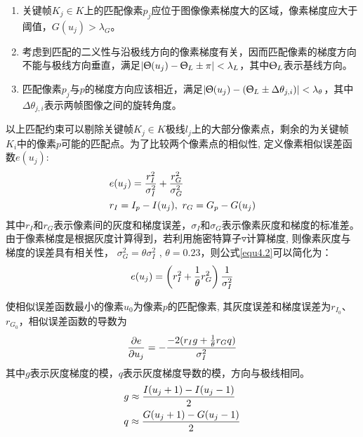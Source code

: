 \begin{enumerate}[label={(\arabic*)}]

\item 关键帧$K_j \in K$上的匹配像素$p_j$应位于图像像素梯度大的区域，像素梯度应大于阈值，$G(u_j)> \lambda_G$。

\item 考虑到匹配的二义性与沿极线方向的像素梯度有关，因而匹配像素的梯度方向不能与极线方向垂直，满足$\vert \Uptheta(u_j)-\Uptheta_L \pm \pi \vert < \lambda_L$，其中$\Uptheta_L$表示基线方向。

\item 匹配像素$p_j$与$p$的梯度方向应该相近，满足$\vert \Uptheta(u_j)-(\Uptheta_L \pm \Delta \theta_{j,i}) \vert < \lambda_\theta $，其中$\Delta \theta_{j,i}$表示两帧图像之间的旋转角度。

\end{enumerate}
以上匹配约束可以剔除关键帧$K_j \in K$极线$l_j$上的大部分像素点，剩余的为关键帧$K_i$中的像素$p$可能的匹配点。为了比较两个像素点的相似性, 定义像素相似误差函数$e(u_j)$:
\begin{equation}
\label{equ4.2}
\begin{aligned}
& e(u_j) = {r_I^2 \over \sigma_I^2} + {r_G^2 \over \sigma_G^2} \\ 
& r_I = I_p-I(u_j),\  r_G = G_p-G(u_j)
\end{aligned}
\end{equation}
其中$r_I$和$r_G$表示像素间的灰度和梯度误差，$\sigma_I$和$\sigma_G$表示像素灰度和梯度的标准差。由于像素梯度是根据灰度计算得到，若利用施密特算子$\triangledown$计算梯度, 则像素灰度与梯度的误差具有相关性，
$\sigma_G^2=\theta \sigma_I^2$ , $ \theta = 0.23$，则公式\eqref{equ4.2}可以简化为：
\begin{equation}
\label{equ4.3}
 e(u_j) = \left( {r_I^2}+{1 \over \theta} r_G^2 \right) {1 \over \sigma_I^2}
\end{equation} 

使相似误差函数最小的像素$u_0$为像素$p$的匹配像素, 其灰度误差和梯度误差为$r_{I_0}$、$r_{G_0}$，相似误差函数的导数为
\begin{equation}
\label{equ4.4}
{\partial e \over \partial u_j } = -{ -2(r_I g+ { 1 \over \theta} r_G q )  \over \sigma_I^2 }
\end{equation}
其中$g$表示灰度梯度的模，$q$表示灰度梯度导数的模，方向与极线相同。
\begin{equation}
\label{equ4.5}
\begin{aligned}
& g \approx { {I(u_j+1) - I(u_j-1)} \over 2 } \\
& q \approx { {G(u_j+1) - G(u_j-1)} \over 2 } 
\end{aligned}
\end{equation}

